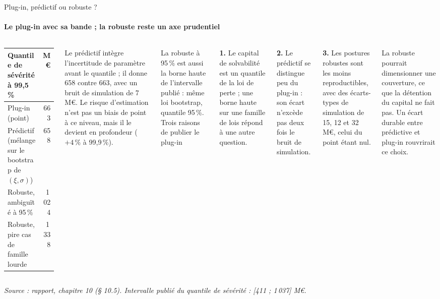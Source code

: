 \documentclass[aspectratio=169,10pt,t]{beamer}
\newcommand{\source}[1]{\par\vfill{\tiny\color{gris}\textit{Source : #1}}\par\vspace{-1mm}}
\renewcommand{\arraystretch}{1.25}
\begin{document}
\begin{frame}{Plug-in, prédictif ou robuste ?}
  \framesubtitle{\ajout Le plug-in avec sa bande ; la robuste reste un axe prudentiel}
  \begin{columns}[T,onlytextwidth]
    \footnotesize
    \renewcommand{\arraystretch}{1.2}
    \begin{tabular}{@{}lr@{}}
      \toprule
      Quantile de sévérité à 99,5\,\% & M€ \\
      \midrule
      Plug-in (point) & 663 \\
      Prédictif (mélange sur le bootstrap de $(\xi,\sigma)$) & 658 \\
      Robuste, ambiguïté à 95\,\% & 1\,024 \\
      Robuste, pire cas de famille lourde & 1\,338 \\
      \bottomrule
    \end{tabular}\par\vspace{2mm}
    Le prédictif intègre l'incertitude de paramètre avant le quantile ; il donne 658 contre 663, avec un bruit de simulation de 7 M€. Le risque d'estimation n'est pas un biais de point à ce niveau, mais il le devient en profondeur ($+4\,\%$ à 99,9\,\%).\par\vspace{1.5mm}
    La robuste à 95\,\% est aussi la borne haute de l'intervalle publié : même loi bootstrap, quantile 95\,\%.
    \footnotesize
    {\editorial\normalsize Trois raisons de publier le plug-in}\par\vspace{1.5mm}
    \textbf{1.} Le capital de solvabilité est un quantile de la loi de perte ; une borne haute sur une famille de lois répond à une autre question.\par\vspace{1mm}
    \textbf{2.} Le prédictif se distingue peu du plug-in : son écart n'excède pas deux fois le bruit de simulation.\par\vspace{1mm}
    \textbf{3.} Les postures robustes sont les moins reproductibles, avec des écarts-types de simulation de 15, 12 et 32 M€, celui du point étant nul.\par\vspace{1.5mm}
    La robuste pourrait dimensionner une couverture, ce que la détention du capital ne fait pas. Un écart durable entre prédictive et plug-in rouvrirait ce choix.
  \end{columns}
  \source{rapport, chapitre 10 (§ 10.5). Intervalle publié du quantile de sévérité : [411 ; 1\,037] M€.}
\end{frame}
\end{document}

